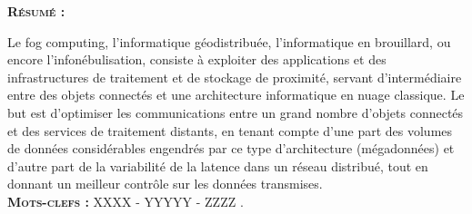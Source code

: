 \large{\textsc{\textbf{Résumé :}}}

Le fog computing, l'informatique géodistribuée, l'informatique en brouillard, ou encore l'infonébulisation, consiste à exploiter des applications et des infrastructures de traitement et de stockage de proximité, servant d'intermédiaire entre des objets connectés et une architecture informatique en nuage classique. Le but est d'optimiser les communications entre un grand nombre d'objets connectés et des services de traitement distants, en tenant compte d'une part des volumes de données considérables engendrés par ce type d'architecture (mégadonnées) et d'autre part de la variabilité de la latence dans un réseau distribué, tout en donnant un meilleur contrôle sur les données transmises.\\

\textsc{\textbf{Mots-clefs :}} XXXX - YYYYY - ZZZZ .\\ \\